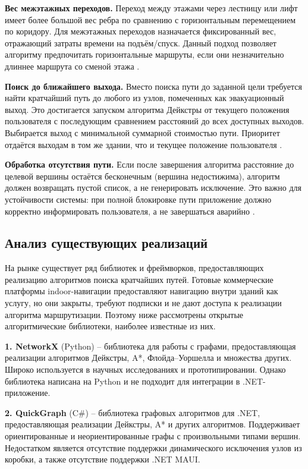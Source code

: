 \textbf{Вес межэтажных переходов.} Переход между этажами через лестницу или лифт имеет более большой вес ребра по сравнению с горизонтальным перемещением по коридору. Для межэтажных переходов назначается фиксированный вес, отражающий затраты времени на подъём/спуск. Данный подход позволяет алгоритму предпочитать горизонтальные маршруты, если они незначительно длиннее маршрута со сменой этажа \cite{gravit2019}.

\textbf{Поиск до ближайшего выхода.} Вместо поиска пути до заданной цели требуется найти кратчайший путь до любого из узлов, помеченных как эвакуационный выход. Это достигается запуском алгоритма Дейкстры от текущего положения пользователя с последующим сравнением расстояний до всех доступных выходов. Выбирается выход с минимальной суммарной стоимостью пути. Приоритет отдаётся выходам в том же здании, что и текущее положение пользователя \cite{han2020,yen2021}.

\textbf{Обработка отсутствия пути.} Если после завершения алгоритма расстояние до целевой вершины остаётся бесконечным (вершина недостижима), алгоритм должен возвращать пустой список, а не генерировать исключение. Это важно для устойчивости системы: при полной блокировке пути приложение должно корректно информировать пользователя, а не завершаться аварийно \cite{deng2021}.

\subsection{Анализ существующих реализаций}

На рынке существует ряд библиотек и фреймворков, предоставляющих реализацию алгоритмов поиска кратчайших путей. Готовые коммерческие платформы indoor-навигации \cite{navigineSdk,situmDocs,mappedinDocs,twogisFloors,mapstedOfficial} предоставляют навигацию внутри зданий как услугу, но они закрыты, требуют подписки и не дают доступа к реализации алгоритма маршрутизации. Поэтому ниже рассмотрены открытые алгоритмические библиотеки, наиболее известные из них.

\textbf{1. NetworkX} (Python) -- библиотека для работы с графами, предоставляющая реализации алгоритмов Дейкстры, A*, Флойда--Уоршелла и множества других. Широко используется в научных исследованиях и прототипировании. Однако библиотека написана на Python и не подходит для интеграции в .NET-приложение.

\textbf{2. QuickGraph} (C\#) -- библиотека графовых алгоритмов для .NET, предоставляющая реализации Дейкстры, A* и других алгоритмов. Поддерживает ориентированные и неориентированные графы с произвольными типами вершин. Недостатком является отсутствие поддержки динамического исключения узлов из коробки, а также отсутствие поддержки .NET MAUI.

